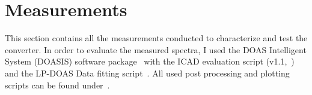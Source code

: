 \section{Measurements}
\label{sec:measurements}

This section contains all the measurements conducted to characterize
and test the converter. In order to evaluate the measured spectra, I
used the DOAS Intelligent System (DOASIS) software
package~\cite{doasis} with the ICAD evaluation script
(v1.1,~\cite{martin}) and the LP-DOAS Data fitting
script~\cite{denis}. All used post processing and plotting scripts can
be found under~\cite{scripts}.

